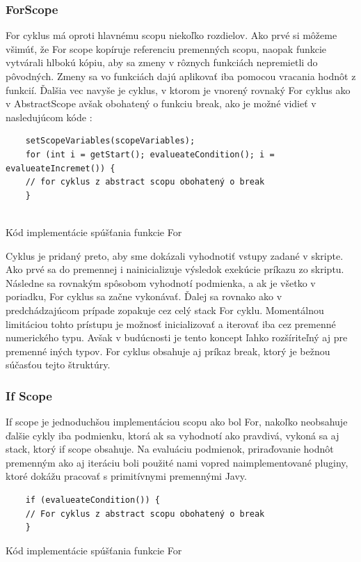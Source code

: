\subsubsection{ForScope}
\indent For cyklus má oproti hlavnému scopu niekoľko rozdielov. Ako prvé si môžeme všimúť, že For scope kopíruje referenciu premenných scopu, naopak funkcie vytvárali hlbokú kópiu, aby sa zmeny v rôznych funkciách nepremietli do pôvodných. Zmeny sa vo funkciách dajú aplikovať iba pomocou vracania hodnôt z funkcií. Ďalšia vec navyše je cyklus, v ktorom je vnorený rovnaký For cyklus ako v AbstractScope avšak obohatený o funkciu break, ako je možné vidieť v nasledujúcom kóde :
\begin{algorithm}[H]
	\begin{verbatim}
	setScopeVariables(scopeVariables);
	for (int i = getStart(); evalueateCondition(); i = evalueateIncremet()) {
	// for cyklus z abstract scopu obohatený o break
	}
	
	\end{verbatim}
	\caption{Kód implementácie spúšťania funkcie For}
	\label{alg:gen}
\end{algorithm}
\indent Cyklus je pridaný preto, aby sme dokázali vyhodnotiť vstupy zadané v skripte. Ako prvé sa do premennej i nainicializuje výsledok exekúcie príkazu zo skriptu. Následne sa rovnakým spôsobom vyhodnotí podmienka, a ak je všetko v poriadku, For cyklus sa začne vykonávať. Ďalej sa rovnako ako v predchádzajúcom prípade zopakuje cez celý stack For cyklu. Momentálnou limitáciou tohto prístupu je možnosť inicializovať a iterovať iba cez premenné numerického typu. Avšak v budúcnosti je tento koncept ľahko rozšíriteľný aj pre premenné iných typov. For cyklus obsahuje aj príkaz break, ktorý je bežnou súčasťou tejto štruktúry.
\subsubsection{If Scope}
\indent If scope je jednoduchšou implementáciou scopu ako bol For, nakoľko neobsahuje ďalšie cykly iba podmienku, ktorá ak sa vyhodnotí ako pravdivá, vykoná sa aj stack, ktorý if scope obsahuje. Na evaluáciu podmienok, priraďovanie hodnôt premenným ako aj iteráciu boli použité nami vopred naimplementované pluginy, ktoré dokážu pracovať s primitívnymi premennými Javy. 
\begin{algorithm}[H]
	\begin{verbatim}
	if (evalueateCondition()) {
	// For cyklus z abstract scopu obohatený o break
	}
	\end{verbatim}
	\caption{Kód implementácie spúšťania funkcie For}
	\label{alg:gen}
\end{algorithm}
